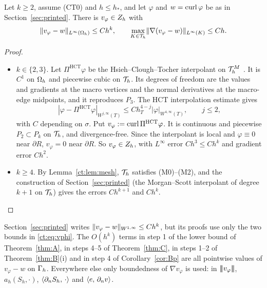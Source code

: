 \begin{lemma}\label{ct:lem:vphi}
Let $k\ge2$, assume (CT0) and $h\le h_\ast$, and let $\varphi$ and $w=\operatorname{curl}\varphi$ be as in Section~\ref{sec:printed}. There is $v_\varphi\in Z_h$ with
\begin{equation}\label{ct:eq:vphi}
\lVert v_\varphi-w\rVert_{L^\infty(\Omega_h)}\le Ch^k,\qquad\max_{K\in\mathcal T_h}\lVert \nabla(v_\varphi-w)\rVert_{L^\infty(K)}\le Ch .
\end{equation}
\end{lemma}

\begin{proof}
\begin{itemize}
\item $k\in\{2,3\}$. Let $\Pi^{\mathrm{HCT}}\varphi$ be the Hsieh--Clough--Tocher interpolant on $\mathcal T_h^M$ \cite{CloughTocher1965}. It is $C^1$ on $\Omega_h$ and piecewise cubic on $\mathcal T_h$. Its degrees of freedom are the values and gradients at the macro vertices and the normal derivatives at the macro-edge midpoints, and it reproduces $P_3$. The HCT interpolation estimate \cite[Section 6.1]{Ciarlet1978book} gives
\[
|\varphi-\Pi^{\mathrm{HCT}}\varphi|_{W^{j,\infty}(T)}\le Ch_T^{4-j}|\varphi|_{W^{4,\infty}(T)},\qquad j\le2,
\]
with $C$ depending on $\sigma$. Put $v_\varphi:=\operatorname{curl}\Pi^{\mathrm{HCT}}\varphi$. It is continuous and piecewise $P_2\subset P_k$ on $\mathcal T_h$, and divergence-free. Since the interpolant is local and $\varphi\equiv0$ near $\partial R$, $v_\varphi=0$ near $\partial R$. So $v_\varphi\in Z_h$, with $L^\infty$ error $Ch^3\le Ch^k$ and gradient error $Ch^2$.
\item $k\ge4$. By Lemma~\ref{ct:lem:mesh}, $\mathcal T_h$ satisfies (M0)--(M2), and the construction of Section~\ref{sec:printed} (the Morgan--Scott interpolant of degree $k+1$ \cite{MorganScott1975} on $\mathcal T_h$) gives the errors $Ch^{k+1}$ and $Ch^k$.\qedhere
\end{itemize}
\end{proof}

Section~\ref{sec:printed} writes $\lVert v_\varphi-w\rVert_{W^{1,\infty}}\le Ch^k$, but its proofs use only the two bounds in \eqref{ct:eq:vphi}. The $O(h^k)$ terms in step 1 of the lower bound of Theorem~\ref{thm:A}, in steps 4--5 of Theorem~\ref{thm:C}, in steps 1--2 of Theorem~\ref{thm:B}(i) and in step 4 of Corollary~\ref{cor:Bp} are all pointwise values of $v_\varphi-w$ on $\Gamma_h$. Everywhere else only boundedness of $\nabla v_\varphi$ is used: in $|\!|\!|v_\varphi|\!|\!|$, $a_h(S_h,\cdot)$, $\langle \partial_n S_h,\, \cdot\rangle$ and $\langle e,\, \partial_n v\rangle$.


